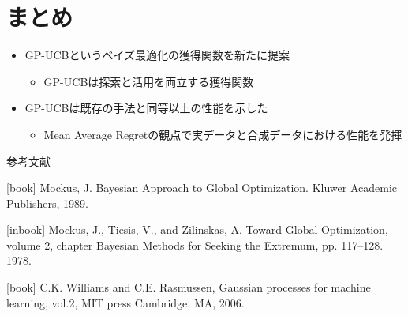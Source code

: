 \documentclass[dvipdfmx, 10.5pt]{beamer}
\begin{document}
\section{まとめ}

\begin{frame}{\insertsection}
	\begin{itemize}
		\item GP-UCBという\textcolor{myorange}{ベイズ最適化の獲得関数を新たに提案}
		\begin{itemize}
			\vspace{2pt}
			\item GP-UCBは探索と活用を両立する獲得関数
		\end{itemize}
		\vspace{10pt}
		\item GP-UCBは\textcolor{myorange}{既存の手法と同等以上の性能}を示した
		\begin{itemize}
			\vspace{2pt}
			\item Mean Average Regretの観点で実データと合成データにおける性能を発揮
		\end{itemize}
	\end{itemize}

\end{frame}


\begin{frame}[noframenumbering]{参考文献}
	\begin{thebibliography}{}
		Mockus, J. Bayesian Approach to Global Optimization. Kluwer Academic Publishers, 1989.

		[inbook]
		Mockus, J., Tiesis, V., and Zilinskas, A. Toward Global Optimization, volume 2, chapter Bayesian Methods for Seeking the Extremum, pp. 117–128. 1978.

		C.K. Williams and C.E. Rasmussen, Gaussian processes for machine learning, vol.2, MIT press Cambridge, MA, 2006.		\end{thebibliography}		
\end{frame}
\end{document}
